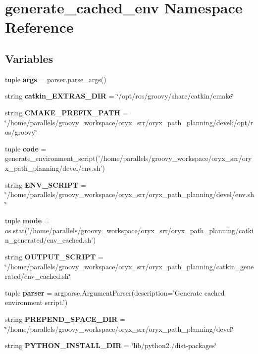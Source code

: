 \section{generate\-\_\-cached\-\_\-env \-Namespace \-Reference}
\label{namespacegenerate__cached__env}
\subsection*{\-Variables}
\begin{DoxyCompactItemize}
\item 
tuple {\bf args} = parser.\-parse\-\_\-args()
\item 
string {\bf catkin\-\_\-\-E\-X\-T\-R\-A\-S\-\_\-\-D\-I\-R} = \char`\"{}/opt/ros/groovy/share/catkin/cmake\char`\"{}
\item 
string {\bf \-C\-M\-A\-K\-E\-\_\-\-P\-R\-E\-F\-I\-X\-\_\-\-P\-A\-T\-H} = \char`\"{}/home/parallels/groovy\-\_\-workspace/oryx\-\_\-srr/oryx\-\_\-path\-\_\-planning/devel;/opt/ros/groovy\char`\"{}
\item 
tuple {\bf code} = generate\-\_\-environment\-\_\-script('/home/parallels/groovy\-\_\-workspace/oryx\-\_\-srr/oryx\-\_\-path\-\_\-planning/devel/env.\-sh')
\item 
string {\bf \-E\-N\-V\-\_\-\-S\-C\-R\-I\-P\-T} = \char`\"{}/home/parallels/groovy\-\_\-workspace/oryx\-\_\-srr/oryx\-\_\-path\-\_\-planning/devel/env.\-sh\char`\"{}
\item 
tuple {\bf mode} = os.\-stat('/home/parallels/groovy\-\_\-workspace/oryx\-\_\-srr/oryx\-\_\-path\-\_\-planning/catkin\-\_\-generated/env\-\_\-cached.\-sh')
\item 
string {\bf \-O\-U\-T\-P\-U\-T\-\_\-\-S\-C\-R\-I\-P\-T} = \char`\"{}/home/parallels/groovy\-\_\-workspace/oryx\-\_\-srr/oryx\-\_\-path\-\_\-planning/catkin\-\_\-generated/env\-\_\-cached.\-sh\char`\"{}
\item 
tuple {\bf parser} = argparse.\-Argument\-Parser(description='\-Generate cached environment script.')
\item 
string {\bf \-P\-R\-E\-P\-E\-N\-D\-\_\-\-S\-P\-A\-C\-E\-\_\-\-D\-I\-R} = \char`\"{}/home/parallels/groovy\-\_\-workspace/oryx\-\_\-srr/oryx\-\_\-path\-\_\-planning/devel\char`\"{}
\item 
string {\bf \-P\-Y\-T\-H\-O\-N\-\_\-\-I\-N\-S\-T\-A\-L\-L\-\_\-\-D\-I\-R} = \char`\"{}lib/python2./dist-\/packages\char`\"{}
\end{DoxyCompactItemize}


